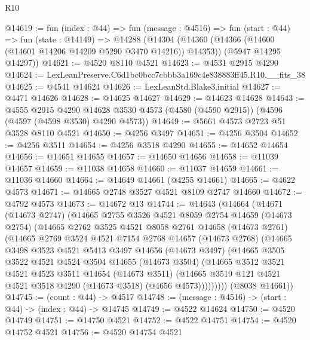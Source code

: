 \begin{lexlean}{R10}
\begin{coremodule}
@14619 := fun (index : @44) =>
  fun (message : @4516) =>
  fun (start : @44) =>
  fun (state : @14149) =>
  @14288
    (@14304
      (@14360 (@14366 (@14600 (@14601 @14206 @14209 @5290 @3470 @14216)) @14353))
      (@5947 @14295 @14297))
@14621 := @4520 @8110 @4521
@14623 := @4531 @2915 @4290
@14624 := LexLeanPreserve.C6d1bc0bcc7cbbb3a169c4e838883ff45.R10.__fits_38
@14625 := @4541 @14624
@14626 := LexLeanStd.Blake3.initial
@14627 := @4471 @14626
@14628 := @14625 @14627
@14629 := @14623 @14628
@14643 := @4555
    @2915
    @4290
    @14628
    @3530
    @4573
    (@4580 (@4590 @2915))
    (@4596 (@4597 (@4598 @3530) @4290 @4573))
@14649 := @5661 @4573 @2723 @51 @3528 @8110 @4521
@14650 := @4256 @3497
@14651 := @4256 @3504
@14652 := @4256 @3511
@14654 := @4256 @3518 @4290
@14655 := @14652 @14654
@14656 := @14651 @14655
@14657 := @14650 @14656
@14658 := @11039 @14657
@14659 := @11038 @14658
@14660 := @11037 @14659
@14661 := @11036 @14660
@14664 := @14649 @14661 (@4255 @14661)
@14665 := @4622 @4573
@14671 := @14665 @2748 @3527 @4521 @8109 @2747 @14660
@14672 := @4792 @4573
@14673 := @14672 @13
@14744 := @14643
    (@14664
      (@14671
        (@14673 @2747)
        (@14665
          @2755
          @3526
          @4521
          @8059
          @2754
          @14659
          (@14673 @2754)
          (@14665
            @2762
            @3525
            @4521
            @8058
            @2761
            @14658
            (@14673 @2761)
            (@14665
              @2769
              @3524
              @4521
              @7154
              @2768
              @14657
              (@14673 @2768)
              (@14665
                @3498
                @3523
                @4521
                @5413
                @3497
                @14656
                (@14673 @3497)
                (@14665
                  @3505
                  @3522
                  @4521
                  @4524
                  @3504
                  @14655
                  (@14673 @3504)
                  (@14665
                    @3512
                    @3521
                    @4521
                    @4523
                    @3511
                    @14654
                    (@14673 @3511)
                    (@14665 @3519 @121 @4521 @4521 @3518 @4290 (@14673 @3518) (@4656 @4573)))))))))
      (@8038 @14661))
@14745 := (count : @44) -> @4517
@14748 := (message : @4516) -> (start : @44) -> (index : @44) -> @14745
@14749 := @4522 @14624
@14750 := @4520 @14749
@14751 := @14750 @4521
@14752 := @4522 @14751
@14754 := @4520 @14752 @4521
@14756 := @4520 @14754 @4521

\end{coremodule}
\end{lexlean}
